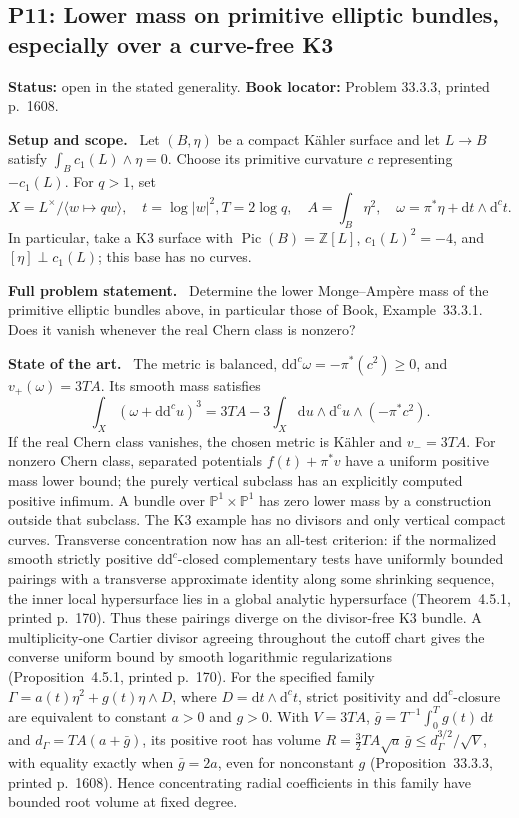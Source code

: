 \documentclass[11pt]{article}
\newcommand{\ddc}{\mathrm d\mathrm d^c}
\newcommand{\field}[1]{\par\medskip\noindent\textbf{#1.}\ }
\begin{document}
\subsection{P11: Lower mass on primitive elliptic bundles, especially over a curve-free K3}
\label{P11}
\noindent\textbf{Status:} open in the stated generality. \textbf{Book locator:} Problem 33.3.3, printed p.~1608.
\field{Setup and scope} Let $(B,\eta)$ be a compact K\"ahler surface and let $L\to B$ satisfy $\int_Bc_1(L)\wedge\eta=0$. Choose its primitive curvature $c$ representing $-c_1(L)$. For $q>1$, set
\[X=L^\times/\langle w\mapsto qw\rangle,\quad t=\log|w|^2,
 T=2\log q,\quad A=\int_B\eta^2,\quad
 \omega=\pi^*\eta+\mathrm dt\wedge\mathrm d^ct.\]
In particular, take a K3 surface with $\operatorname{Pic}(B)=\mathbb Z[L]$, $c_1(L)^2=-4$, and $[\eta]\perp c_1(L)$; this base has no curves.
\field{Full problem statement} Determine the lower Monge--Amp\`ere mass of the primitive elliptic bundles
above, in particular those of Book, Example~33.3.1.
Does it vanish whenever the real Chern class is nonzero?
\field{State of the art} The metric is balanced, $\ddc\omega=-\pi^*(c^2)\geq0$, and $v_+(\omega)=3TA$. Its smooth mass satisfies
\[\int_X(\omega+\ddc u)^3=3TA-3\int_X\mathrm du\wedge\mathrm d^cu\wedge(-\pi^*c^2).\]
If the real Chern class vanishes, the chosen metric is K\"ahler and $v_-=3TA$. For nonzero Chern class, separated potentials $f(t)+\pi^*v$ have a uniform positive mass lower bound; the purely vertical subclass has an explicitly computed positive infimum. A bundle over $\mathbb P^1\times\mathbb P^1$ has zero lower mass by a construction outside that subclass. The K3 example has no divisors and only vertical compact curves. Transverse concentration now has an all-test criterion: if the normalized smooth strictly positive $\ddc$-closed complementary tests have uniformly bounded pairings with a transverse approximate identity along some shrinking sequence, the inner local hypersurface lies in a global analytic hypersurface (Theorem~4.5.1, printed p.~170). Thus these pairings diverge on the divisor-free K3 bundle. A multiplicity-one Cartier divisor agreeing throughout the cutoff chart gives the converse uniform bound by smooth logarithmic regularizations (Proposition~4.5.1, printed p.~170). For the specified family $\Gamma=a(t)\eta^2+g(t)\eta\wedge D$, where $D=\mathrm dt\wedge\mathrm d^ct$, strict positivity and $\ddc$-closure are equivalent to constant $a>0$ and $g>0$. With $V=3TA$, $\bar g=T^{-1}\int_0^Tg(t)\,\mathrm dt$ and $d_\Gamma=TA(a+\bar g)$, its positive root has volume $R=\frac32TA\sqrt a\,\bar g\leq d_\Gamma^{3/2}/\sqrt V$, with equality exactly when $\bar g=2a$, even for nonconstant $g$ (Proposition~33.3.3, printed p.~1608). Hence concentrating radial coefficients in this family have bounded root volume at fixed degree.
\end{document}
